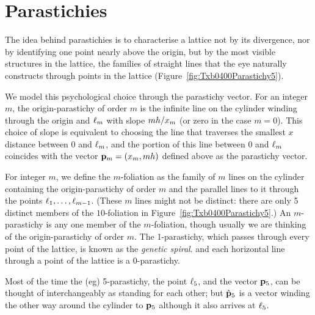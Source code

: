 \section{Parastichies}
\label{sec:parastichies}
The idea behind parastichies is to characterise a lattice not by its divergence, nor by identifying one point nearly above the origin, but by the most visible structures in the lattice, the families of straight lines that the eye naturally constructs through points in the lattice (Figure~\ref{fig:Txb0400Parastichy5}).





We model this psychological choice through the parastichy vector. For an integer $m$, the origin-parastichy of order $m$ is the infinite line on the cylinder winding through the origin and $\ell_{{m}}$ with slope $mh/x_m$ (or zero in the case $m=0$). This choice of slope is equivalent to choosing the line that traverses the smallest $x$ distance between $0$ and $\ell_{{m}}$, and the portion of this line between $0$ and $\ell_{{m}}$ coincides with the vector ${\mathbf p}_{m}=(x_m,mh)$ defined above as the parastichy vector.

For integer $m$, we define the $m$-foliation as  the family of  $m$ lines on the cylinder containing the origin-parastichy of order $m$ and the parallel lines to it through the points $\ell_{{1}},\ldots,\ell_{{m-1}}$. (These $m$ lines might not be distinct: there are only 5 distinct members of the $10$-foliation in Figure~\ref{fig:Txb0400Parastichy5}.)
An $m$-parastichy is any one member of the $m$-foliation, though usually we are thinking of the origin-parastichy of order $m$. 
The 1-parastichy, which passes through every point of the lattice, is known as the \emph{genetic spiral}. 
 and each horizontal line through a point of the lattice is a $0$-parastichy. 

Most of the time the (eg) 5-parastichy, the point $\ell_{{5}}$, and the vector ${\mathbf p}_{5}$,  can be thought of interchangeably as standing for each other; but $\hat{\mathbf p}_{5}$ is a  vector winding the other way around the cylinder to ${\mathbf p}_{5}$ although it also arrives at  $\ell_{{5}}$.
